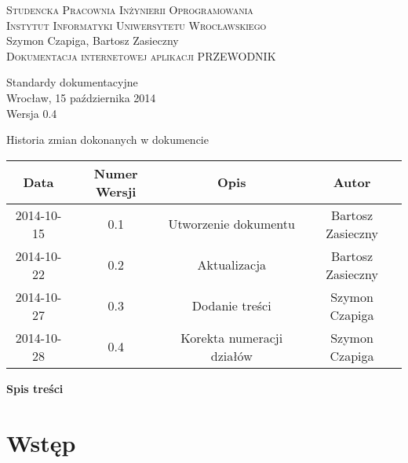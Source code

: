 \documentclass[12pt,a4paper]{report}
\makeatletter
\newcommand*{\toccontents}{\@starttoc{toc}}
\makeatother
\begin{document}
\newcommand{\itab}[1]{\hspace{4em}\rlap{#1}}
\newcommand{\tab}[1]{\hspace{.2\textwidth}\rlap{#1}}

\begin{titlepage}
\begin{center}
\textsc{Studencka Pracownia Inżynierii Oprogramowania}\\[0.5cm]
\textsc{Instytut Informatyki Uniwersytetu Wrocławskiego}\\[7.3cm]

Szymon Czapiga, Bartosz Zasieczny\\[1.0cm]

\LARGE{\textsc{Dokumentacja internetowej  aplikacji PRZEWODNIK}}\\[1.0cm]

\begin{normalsize}
Standardy dokumentacyjne\\[7.0cm]

Wrocław, 15 października 2014\\[0.5cm]
Wersja 0.4
\end{normalsize}
\end{center}
\end{titlepage}

\begin{table}[h1]
 \itab \textit{Tabela 0.} Historia zmian dokonanych w dokumencie
  \begin{center}
    \begin{tabular}{| c | c | c | c |}
    \hline
    Data & Numer Wersji & Opis & Autor \\
    \hline \hline
    2014-10-15 & 0.1 & Utworzenie dokumentu & Bartosz Zasieczny \\
    \hline
    2014-10-22 & 0.2 & Aktualizacja & Bartosz Zasieczny \\
    \hline
    2014-10-27 & 0.3 & Dodanie treści  & Szymon Czapiga \\
    \hline
    2014-10-28 & 0.4 & Korekta numeracji działów & Szymon Czapiga \\
    \hline
    \end{tabular}
  \end{center}
\end{table}
\textbf{\large{Spis treści}}\\[0.3cm]
\toccontents
\newpage
\section{Wstęp}
\end{document}
